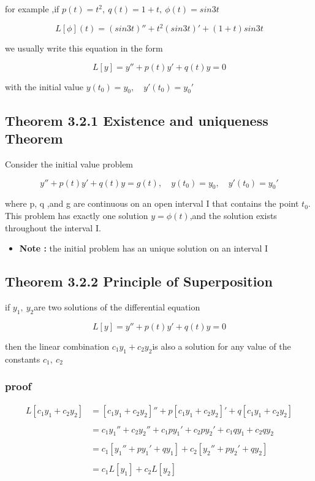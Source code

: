 \documentclass[12pt, a4paper]{article}
\theoremstyle{break}
\providecommand{\tightlist}{\setlength{\itemsep}{0pt}\setlength{\parskip}{0pt}}
\begin{document}
for example ,if \(p(t) = t^2 ,\ q(t) = 1+t,\ \phi(t) = sin3t\)

\[
L[\phi](t) = (sin3t)'' + t^2(sin3t)' + (1+t)sin3t
\]

we usually write this equation in the form

\[
L[y] = y''+p(t)y'+q(t)y = 0
\]

with the initial value \(y(t_0) = y_0,\quad y'(t_0) = y_0'\)

\subsection{Theorem 3.2.1 Existence and uniqueness Theorem}\label{theorem-3.2.1-existence-and-uniqueness-theorem}

Consider the initial value problem

\[
y'' + p(t) y' + q(t) y = g(t),\quad y(t_0) = y_0, \quad y'(t_0) = y_0' 
\]

where p, q ,and g are continuous on an open interval I that contains the point \(t_0\). This problem has exactly one solution \(y = \phi (t)\),and the solution exists throughout the interval I.

\begin{itemize}
\tightlist
\item
  \textbf{Note :} the initial problem has an unique solution on an interval I
\end{itemize}

\subsection{Theorem 3.2.2 Principle of Superposition}\label{theorem-3.2.2-principle-of-superposition}

if \(y_1,\ y_2\)are two solutions of the differential equation

\[
L[y] = y'' + p(t) y' + q(t)y = 0
\]

then the linear combination \(c_1y_1 + c_2 y_2\)is also a solution for any value of the constants \(c_1 ,\ c_2\)

\subsubsection{proof}\label{proof-2}

\[
\begin{aligned}
L[c_1y_1 + c_2 y_2] &= [c_1y_1 + c_2 y_2]'' + p[c_1y_1 + c_2 y_2]' + q[c_1y_1 + c_2 y_2] \\\\
&= c_1y_1'' + c_2y_2'' + c_1py_1' + c_2py_2' + c_1qy_1 + c_2q y_2 \\\\
&= c_1[y_1'' + py_1' + q y_1] + c_2[y_2'' + py_2' + q y_2] \\\\
&= c_1L[y_1] + c_2L[y_2]
\end{aligned}
\]
\end{document}
